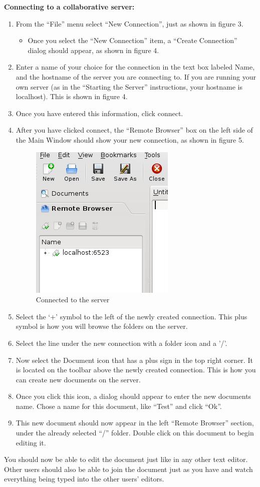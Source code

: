 \documentclass[11pt]{article}
\begin{document}
{\bf Connecting to a collaborative server:}\\
\begin{enumerate}
 \item From the ``File'' menu select ``New Connection'', just as shown in figure 3.
 \begin{itemize}
  \item Once you select the ``New Connection'' item, a ``Create Connection'' dialog should appear, as shown in figure 4.
 \end{itemize}
 \item Enter a name of your choice for the connection in the text box labeled Name, and the hostname of the server you are connecting to.  If you are running your own server (as in the ``Starting the Server'' instructions, your hostname is localhost).  This is shown in figure 4.
 \item Once you have entered this information, click connect.
 \item After you have clicked connect, the ``Remote Browser'' box on the left side of the Main Window should show your new connection, as shown in figure 5.
\begin{figure}[tbh]
\begin{center}
 \includegraphics[width=.4\textwidth]{kobbylocalhostconnection.png}
\end{center}
\caption{Connected to the server}
\end{figure}
 \item Select the `+' symbol to the left of the newly created connection.  This plus symbol is how you will browse the folders on the server.
 \item Select the line under the new connection with a folder icon and a '/'.
 \item Now select the Document icon that has a plus sign in the top right corner.  It is located on the toolbar above the newly created connection.  This is how you can create new documents on the server.
 \item Once you click this icon, a dialog should appear to enter the new documents name.  Chose a name for this document, like ``Test'' and click ``Ok''.
 \item This new document should now appear in the left ``Remote Browser'' section, under the already selected ``/'' folder.  Double click on this document to begin editing it.
\end{enumerate}

You should now be able to edit the document just like in any other text editor.  Other users should also be able to join the document just as you have and watch everything being typed into the other users' editors.
\end{document}
